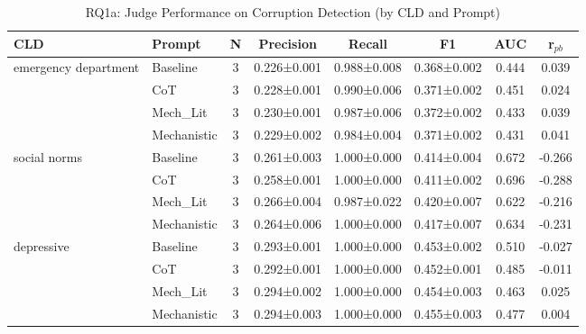 \begin{table}[htbp]
\centering
\caption{RQ1a: Judge Performance on Corruption Detection (by CLD and Prompt)}
\label{tab:rq1a_main}
\begin{tabular}{llcccccc}
\toprule
\textbf{CLD} & \textbf{Prompt} & \textbf{N} & \textbf{Precision} & \textbf{Recall} & \textbf{F1} & \textbf{AUC} & \textbf{r$_{pb}$} \\
\midrule
emergency department & Baseline & 3 & 0.226±0.001 & 0.988±0.008 & 0.368±0.002 & 0.444 & 0.039 \\
 & CoT & 3 & 0.228±0.001 & 0.990±0.006 & 0.371±0.002 & 0.451 & 0.024 \\
 & Mech_Lit & 3 & 0.230±0.001 & 0.987±0.006 & 0.372±0.002 & 0.433 & 0.039 \\
 & Mechanistic & 3 & 0.229±0.002 & 0.984±0.004 & 0.371±0.002 & 0.431 & 0.041 \\
\midrule
social norms & Baseline & 3 & 0.261±0.003 & 1.000±0.000 & 0.414±0.004 & 0.672 & -0.266 \\
 & CoT & 3 & 0.258±0.001 & 1.000±0.000 & 0.411±0.002 & 0.696 & -0.288 \\
 & Mech_Lit & 3 & 0.266±0.004 & 0.987±0.022 & 0.420±0.007 & 0.622 & -0.216 \\
 & Mechanistic & 3 & 0.264±0.006 & 1.000±0.000 & 0.417±0.007 & 0.634 & -0.231 \\
\midrule
depressive & Baseline & 3 & 0.293±0.001 & 1.000±0.000 & 0.453±0.002 & 0.510 & -0.027 \\
 & CoT & 3 & 0.292±0.001 & 1.000±0.000 & 0.452±0.001 & 0.485 & -0.011 \\
 & Mech_Lit & 3 & 0.294±0.002 & 1.000±0.000 & 0.454±0.003 & 0.463 & 0.025 \\
 & Mechanistic & 3 & 0.294±0.003 & 1.000±0.000 & 0.455±0.003 & 0.477 & 0.004 \\
\midrule
\bottomrule
\end{tabular}
\end{table}